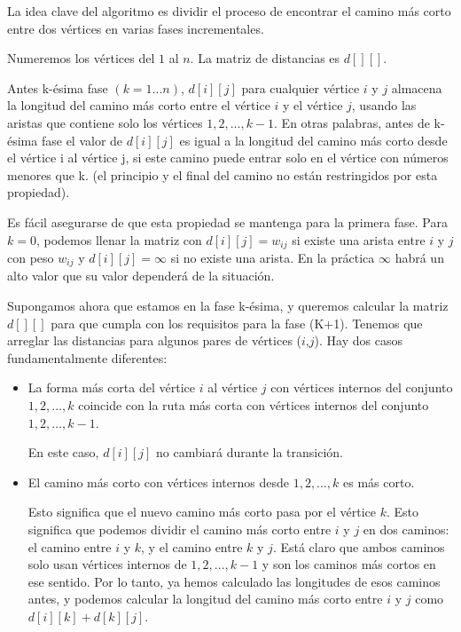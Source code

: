 La idea clave del algoritmo es dividir el proceso de encontrar el camino más corto entre dos vértices en varias fases incrementales.

Numeremos los vértices del $1$ al $n$. La matriz de distancias es $d[][]$.

Antes k-ésima fase $(k=1 ... n)$, $d[i][j]$ para cualquier vértice $i$ y $j$ almacena la longitud del 
camino más corto entre el vértice $i$ y el vértice $j$, usando las aristas que contiene solo los 
vértices ${1,2,. ..,k-1}$. En otras palabras, antes de k-ésima fase el valor de $d[i][j]$ es igual a la longitud del camino más corto desde el vértice i al vértice j, si este camino puede entrar solo en el vértice con números menores que k. (el principio y el final del camino no están restringidos por esta propiedad).

Es fácil asegurarse de que esta propiedad se mantenga para la primera fase. Para $k = 0$, podemos llenar la matriz con $d[i][j] = w_{ij}$ si existe una arista entre $i$ y $j$ con peso $w_{ij}$ y $d[i] [j] =\infty $ si no existe una arista. En la práctica $\infty$ habrá un alto valor que su valor dependerá de la situación.

Supongamos ahora que estamos en la fase k-ésima, y queremos calcular la matriz $d[][]$ para que cumpla con los requisitos para la fase (K+1). Tenemos que arreglar las distancias para algunos pares de vértices ($i$,$j$). Hay dos casos fundamentalmente diferentes:

\begin{itemize}
	\item La forma más corta del vértice $i$ al vértice $j$ con vértices internos del conjunto ${1,2, \dots, k}$ coincide con la ruta más corta con vértices internos del conjunto ${1,2, \dots, k - 1}$.
	
	En este caso, $d[i][j]$ no cambiará durante la transición.
	
	\item El camino más corto con vértices internos desde ${1,2, \dots,k}$ es más corto.
	
	Esto significa que el nuevo camino más corto pasa por el vértice $k$. Esto significa que podemos dividir el camino más corto entre $i$ y $j$ en dos caminos: el camino entre $i$ y $k$, y el camino entre $k$ y $j$. Está claro que ambos caminos solo usan vértices internos de ${1,2, \dots,k-1}$ y son los caminos más cortos en ese sentido. Por lo tanto, ya hemos calculado las longitudes de esos caminos antes, y podemos calcular la longitud del camino más corto entre $i$ y $j$ como $d[i][k]+d[k][j]$.
\end{itemize}

